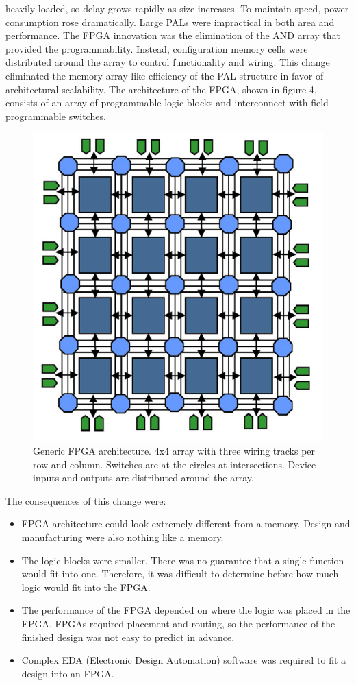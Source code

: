 heavily loaded, so delay grows rapidly as size increases. To maintain speed, power consumption rose dramatically. Large PALs were
impractical in both area and performance.
\newline
The FPGA innovation was the elimination of the AND array that provided the programmability. Instead, configuration
memory cells were distributed around the array to control functionality and wiring. This change eliminated the
memory-array-like efficiency of the PAL structure in favor of architectural scalability. The architecture of the FPGA,
shown in figure 4, consists of an array of programmable logic blocks and interconnect with field-programmable switches.
\begin{figure}[H]
	\centering
	\includegraphics[width=0.7\linewidth]{IMG/ch3/FPGA}
	\caption{Generic FPGA architecture. 4x4 array with three wiring
		tracks per row and column. Switches are at the circles at intersections.
		Device inputs and outputs are distributed around the array.}
	\label{fig:fpga}
\end{figure}
\noindent The consequences of this change were:
\begin{itemize}
	\item FPGA architecture could look extremely different from a memory. Design and manufacturing were also nothing like a memory.
	\item The logic blocks were smaller. There was no guarantee that a single function would fit into one. Therefore, it was difficult to determine before how much logic would fit into the FPGA.
	\item The performance of the FPGA depended on where the logic was placed in the FPGA. FPGAs required placement and routing, so the performance of the finished design was not easy to predict in advance.
	\item Complex EDA (Electronic Design Automation) software was required to fit a design into an FPGA.
\end{itemize}



